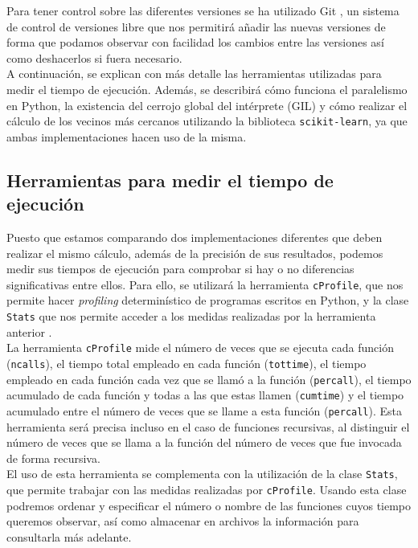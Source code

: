 \documentclass[12pt,a4paper]{report} %
\theoremstyle{definition}
\begin{document}
Para tener control sobre las diferentes versiones se ha utilizado Git \cite{git}, un sistema de control de versiones libre que nos permitirá añadir las nuevas versiones de forma que podamos observar con facilidad los cambios entre las versiones así como deshacerlos si fuera necesario.\\

A continuación, se explican con más detalle las herramientas utilizadas para medir el tiempo de ejecución. Además, se describirá cómo funciona el paralelismo en Python, la existencia del cerrojo global del intérprete (GIL) y cómo realizar el cálculo de los vecinos más cercanos utilizando la biblioteca \texttt{scikit-learn}, ya que ambas implementaciones hacen uso de la misma.\\

\subsection{Herramientas para medir el tiempo de ejecución}

Puesto que estamos comparando dos implementaciones diferentes que deben realizar el mismo cálculo, además de la precisión de sus resultados, podemos medir sus tiempos de ejecución para comprobar si hay o no diferencias significativas entre ellos. Para ello, se utilizará la herramienta \texttt{cProfile}, que nos permite hacer \textit{profiling} determinístico de programas escritos en Python, y la clase \texttt{Stats} que nos permite acceder a los medidas realizadas por la herramienta anterior \cite{profilers}.\\

La herramienta \texttt{cProfile} mide el número de veces que se ejecuta cada función (\texttt{ncalls}), el tiempo total empleado en cada función (\texttt{tottime}), el tiempo empleado en cada función cada vez que se llamó a la función (\texttt{percall}), el tiempo acumulado de cada función y todas a las que estas llamen (\texttt{cumtime}) y el tiempo acumulado entre el número de veces que se llame a esta función (\texttt{percall}). Esta herramienta será precisa incluso en el caso de funciones recursivas, al distinguir el número de veces que se llama a la función del número de veces que fue invocada de forma recursiva.\\

El uso de esta herramienta se complementa con la utilización de la clase \texttt{Stats}, que permite trabajar con las medidas realizadas por \texttt{cProfile}. Usando esta clase podremos ordenar y especificar el número o nombre de las funciones cuyos tiempo queremos observar, así como almacenar en archivos la información para consultarla más adelante.\\
\end{document}
